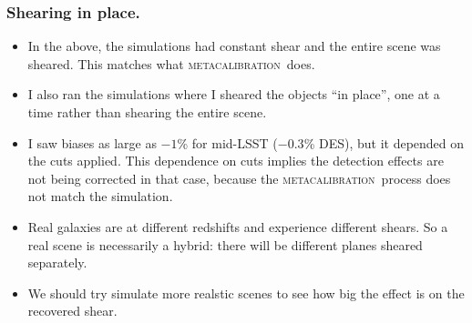 \documentclass{beamer}
\newcommand{\mcal}{\textsc{metacalibration}}
\begin{document}
\begin{frame}
    \frametitle{Shearing in place.}

 
    \begin{itemize}

        \item In the above, the simulations had constant shear and the
            entire scene was sheared.  This matches what \mcal\ does.

        \item I also ran the simulations where I sheared the objects ``in
            place'', one at a time rather than shearing the entire scene.

        \item I saw biases as large as $-1$\% for mid-LSST ($-0.3$\% DES), but it
            depended on the cuts applied.  This dependence on cuts implies the
            detection effects are not being corrected in that case, because
            the \mcal\ process does not match the simulation.

        \item Real galaxies are at different redshifts and experience different
            shears. So a real scene is necessarily a hybrid: there will be
            different planes sheared separately.

        \item We should try simulate more realstic scenes to see how big the
            effect is on the recovered shear.

    \end{itemize}



\end{frame}
\end{document}

